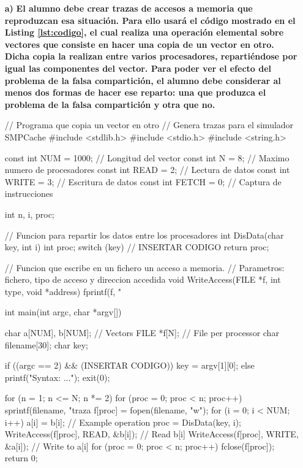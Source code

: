 \begin{itemize}
    \item [\textbf{a)}] \textbf{El alumno debe crear trazas de accesos a memoria que reproduzcan esa situación. Para ello usará el código mostrado en el Listing \ref{lst:codigo}, el cual realiza una operación elemental sobre vectores que consiste en hacer una copia de un vector en otro. Dicha copia la realizan entre varios procesadores, repartiéndose por igual las componentes del vector. Para poder ver el efecto del problema de la falsa compartición, el alumno debe considerar al menos dos formas de hacer ese reparto: una que produzca el problema de la falsa compartición y otra que no.}

    \begin{mycode}[style=cstyle, caption={Código para realizar copia de vectores y generar trazas para SMPCache.}, label=lst:codigo]
// Programa que copia un vector en otro
// Genera trazas para el simulador SMPCache
#include <stdlib.h>
#include <stdio.h>
#include <string.h>

const int NUM = 1000; // Longitud del vector
const int N = 8;      // Maximo numero de procesadores
const int READ = 2;   // Lectura de datos
const int WRITE = 3;  // Escritura de datos
const int FETCH = 0;  // Captura de instrucciones

int n, i, proc;

// Funcion para repartir los datos entre los procesadores
int DisData(char key, int i) {
    int proc;
    switch (key) {
        // INSERTAR CODIGO
    }
    return proc;
}

// Funcion que escribe en un fichero un acceso a memoria.
// Parametros: fichero, tipo de acceso y direccion accedida
void WriteAccess(FILE *f, int type, void *address) {
    fprintf(f, "%
}

int main(int argc, char *argv[]) {
    char a[NUM], b[NUM]; // Vectors
    FILE *f[N]; // File per processor
    char filename[30];
    char key;
    
    if ((argc == 2) && (INSERTAR CODIGO)) {
        key = argv[1][0];
    } else {
        printf("Syntax: ...\n");
        exit(0);
    }

    for (n = 1; n <= N; n *= 2) {
        for (proc = 0; proc < n; proc++) {
            sprintf(filename, "traza%
            f[proc] = fopen(filename, "w");
        }
        for (i = 0; i < NUM; i++) {
            a[i] = b[i]; // Example operation
            proc = DisData(key, i);
            WriteAccess(f[proc], READ, &b[i]);  // Read b[i]
            WriteAccess(f[proc], WRITE, &a[i]); // Write to a[i]
        }
        for (proc = 0; proc < n; proc++) {
            fclose(f[proc]);
        }
    }
    return 0;
}
    \end{mycode}



\end{itemize}
